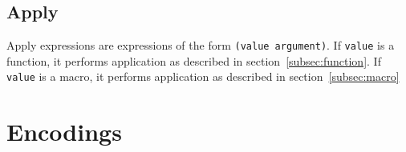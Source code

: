 \documentclass{article}
\begin{document}
\begin{multicols}{2}
        \subsection{Apply}\label{subsec:apply}

        \begin{minipage}{\columnwidth}
            Apply expressions are expressions of the form \lstinline{(value argument)}.
            If \texttt{value} is a function, it performs application as described in section~\ref{subsec:function}.
            If \texttt{value} is a macro, it performs application as described in section~\ref{subsec:macro}
        \end{minipage}
    \end{multicols}
    \newpage

    \section{Encodings}\label{sec:encodings}

    \begin{multicols*}{2}
        \begin{minipage}{\columnwidth}
            
        \end{minipage}
        \begin{minipage}{\columnwidth}
            
        \end{minipage}
        \begin{minipage}{\columnwidth}
            
        \end{minipage}
        \begin{minipage}{\columnwidth}
            
        \end{minipage}
        \begin{minipage}{\columnwidth}
            
        \end{minipage}
        \begin{minipage}{\columnwidth}
            
        \end{minipage}
        \begin{minipage}{\columnwidth}
            
        \end{minipage}
        \begin{minipage}{\columnwidth}
            
        \end{minipage}
    \end{multicols*}
    \newpage
\end{document}
